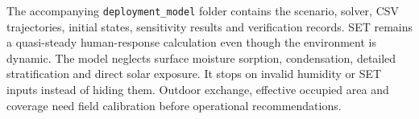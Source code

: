 The accompanying \texttt{deployment\_model} folder contains the scenario, solver, CSV trajectories, initial states, sensitivity results and verification records. SET remains a quasi-steady human-response calculation even though the environment is dynamic. The model neglects surface moisture sorption, condensation, detailed stratification and direct solar exposure. It stops on invalid humidity or SET inputs instead of hiding them. Outdoor exchange, effective occupied area and coverage need field calibration before operational recommendations.
